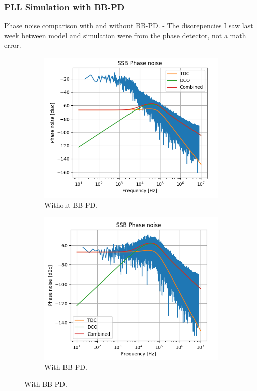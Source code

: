 \documentclass[t, screen, aspectratio=43]{beamer}
\begin{document}
\begin{frame}
	\frametitle{PLL Simulation with BB-PD}
	\begin{block}{Phase noise comparison with and without BB-PD.}
			\scriptsize
			- The discrepencies I saw last week between model and simulation were from the phase detector, not a math error.

		\begin{figure}[htb!]
	        \centering
	        \begin{subfigure}{.5\textwidth}
	            \centering
	            \includegraphics[width=0.9\linewidth]{old_pn.png}
	            \caption{\scriptsize Without BB-PD.}
	            \label{fig:rosc_3stg_cir}
	        \end{subfigure}%
	        \begin{subfigure}{.5\textwidth}
	            \centering
	            \includegraphics[width=0.9\linewidth]{new_pn_bbpd.png}
	            \caption{\scriptsize With BB-PD.}
	            \label{fig:rosc_3stg_wave}
	        \end{subfigure}
	        \label{fig:rosc_3stg}
	    \end{figure}

	\end{block}
\end{frame}
\end{document}
